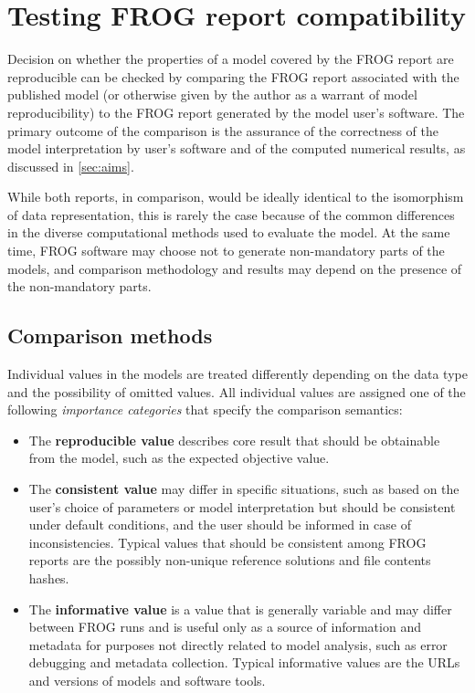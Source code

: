 \chapter{Testing FROG report compatibility}
\label{chap:test}

Decision on whether the properties of a model covered by the FROG report are reproducible can be checked by comparing the FROG report associated with the published model (or otherwise given by the author as a warrant of model reproducibility) to the FROG report generated by the model user's software.
The primary outcome of the comparison is the assurance of the correctness of the model interpretation by user's software and of the computed numerical results, as discussed in \cref{sec:aims}.

While both reports, in comparison, would be ideally identical to the isomorphism of data representation, this is rarely the case because of the common differences in the diverse computational methods used to evaluate the model. At the same time, FROG software may choose not to generate non-mandatory parts of the models, and comparison methodology and results may depend on the presence of the non-mandatory parts.

\section{Comparison methods}

Individual values in the models are treated differently depending on the data type and the possibility of omitted values.
All individual values are assigned one of the following \emph{importance categories} that specify the comparison semantics:
\begin{itemize}
\item The \textbf{reproducible value} describes core result that should be obtainable from the model, such as the expected objective value.
\item The \textbf{consistent value} may differ in specific situations, such as based on the user's choice of parameters or model interpretation but should be consistent under default conditions, and the user should be informed in case of inconsistencies. Typical values that should be consistent among FROG reports are the possibly non-unique reference solutions and file contents hashes.
\item The \textbf{informative value} is a value that is generally variable and may differ between FROG runs and is useful only as a source of information and metadata for purposes not directly related to model analysis, such as error debugging and metadata collection. Typical informative values are the URLs and versions of models and software tools.
\end{itemize}

